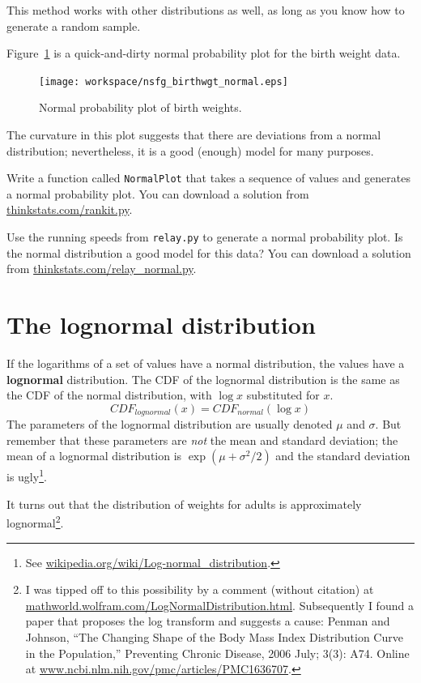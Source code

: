 \documentclass[12pt]{book}
\begin{document}

This method works with other distributions as well, as long as
you know how to generate a random sample.

Figure~\ref{nsfg_birthwgt_normal} is a quick-and-dirty normal
probability plot for the birth weight data.

\begin{figure}
\centerline{\texttt{[image: workspace/nsfg\_birthwgt\_normal.eps]}}
\caption{Normal probability plot of birth weights.}
\label{nsfg_birthwgt_normal}
\end{figure}

The curvature in this plot suggests that there are
deviations from a normal distribution; nevertheless, it is a
good (enough) model for many purposes.

\begin{ex}

Write a function called {\tt NormalPlot} that takes a sequence of
values and generates a normal probability plot.  You can download
a solution from \url{thinkstats.com/rankit.py}.

Use the running speeds from {\tt relay.py} to generate a normal
probability plot.  Is the normal distribution a good model for this
data?  You can download a solution from
\url{thinkstats.com/relay_normal.py}.

\end{ex}


\section{The lognormal distribution}
\label{lognormal}

If the logarithms of a set of values have a normal distribution, the
values have a {\bf lognormal} distribution.  The CDF of the lognormal
distribution is the same as the CDF of the normal distribution,
with $\log x$ substituted for $x$.
%
\[ CDF_{lognormal}(x) = CDF_{normal}(\log x) \]
%
The parameters of the lognormal distribution are usually denoted $\mu$
and $\sigma$.  But remember that these parameters are {\em not} the
mean and standard deviation; the mean of a lognormal distribution is
$\exp(\mu + \sigma^2/2)$ and the standard deviation is
ugly\footnote{See \url{wikipedia.org/wiki/Log-normal_distribution}.}.

It turns out that the distribution of weights for adults is
approximately lognormal\footnote{I was tipped off to this possibility by a
  comment (without citation) at
  \url{mathworld.wolfram.com/LogNormalDistribution.html}.
  Subsequently I found a paper that proposes the log transform and
  suggests a cause: Penman and Johnson, ``The Changing Shape of the
  Body Mass Index Distribution Curve in the Population,'' Preventing
  Chronic Disease, 2006 July; 3(3): A74.  Online
  at \url{www.ncbi.nlm.nih.gov/pmc/articles/PMC1636707}.}.
\end{document}
